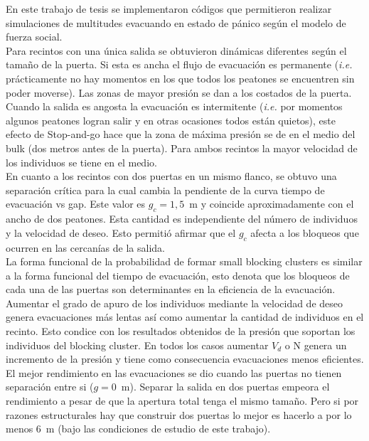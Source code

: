 En este trabajo de tesis se implementaron códigos que permitieron realizar simulaciones de multitudes evacuando en estado de pánico según el modelo de fuerza social. \\

Para recintos con una única salida se obtuvieron dinámicas diferentes según el tamaño de la puerta. Si esta es ancha el flujo de evacuación es permanente (\emph{i.e.} prácticamente no hay momentos en los que todos los peatones se encuentren sin poder moverse). Las zonas de mayor presión se dan a los costados de la puerta. Cuando la salida es angosta la evacuación es intermitente (\emph{i.e.} por momentos algunos peatones logran salir y en otras ocasiones todos están quietos), este efecto de Stop-and-go hace que la zona de máxima presión se de en el medio del bulk (dos metros antes de la puerta). 
Para ambos recintos la mayor velocidad de los individuos se tiene en el medio. \\

En cuanto a los recintos con dos puertas en un mismo flanco, se obtuvo  una separación crítica para la cual cambia la pendiente de la curva tiempo de evacuación vs gap. Este valor es $g_c=1,5$~m y coincide aproximadamente con el ancho de dos peatones. Esta cantidad es independiente del número de individuos y la velocidad de deseo. Esto permitió afirmar que el $g_c$ afecta a los bloqueos que ocurren en las cercanías de la salida. \\

La forma funcional de la probabilidad de formar small blocking clusters es similar a la forma funcional del tiempo de evacuación, esto denota que los bloqueos de cada una de las puertas son determinantes en la eficiencia de la evacuación. \\

Aumentar el grado de apuro de los individuos mediante la velocidad de deseo genera evacuaciones más lentas así como aumentar la cantidad de individuos en el recinto. Esto condice con los resultados obtenidos de la presión que soportan los individuos del blocking cluster. En todos los casos aumentar $V_d$ o N genera un incremento de la presión y tiene como consecuencia evacuaciones menos eficientes.\\

El mejor rendimiento en las evacuaciones se dio cuando las puertas no tienen separación entre si ($g=0$~m). Separar la salida en dos puertas empeora el rendimiento a pesar de que la apertura total tenga el mismo tamaño. Pero si por razones estructurales hay que construir dos puertas lo mejor es hacerlo a por lo menos 6~m (bajo las condiciones de estudio de este trabajo).    
